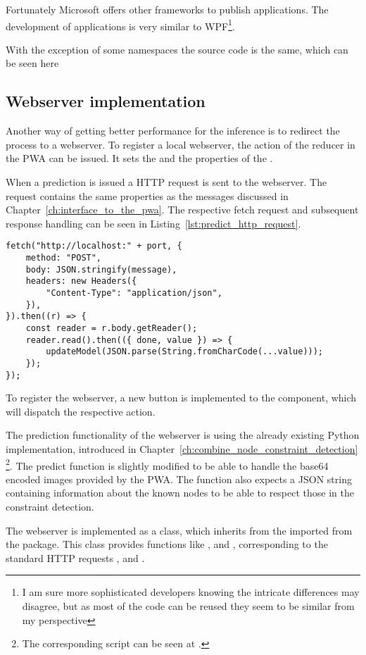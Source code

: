 Fortunately Microsoft offers other frameworks to publish applications.
The development of  applications is very similar to WPF\footnote{I am sure more sophisticated developers knowing the intricate differences may disagree, but as most of the code can be reused they seem to be similar from my perspective}.

With the exception of some namespaces the source code is the same, which can be seen here 

\subsection{Webserver implementation}

Another way of getting better performance for the inference is to redirect the process to a webserver.
To register a local webserver, the  action of the  reducer in the PWA can be issued.
It sets the  and the  properties of the .

When a prediction is issued a HTTP request is sent to the webserver.
The request  contains the same properties as the messages discussed in Chapter~\ref{ch:interface_to_the_pwa}.
The respective fetch request and subsequent response handling can be seen in Listing~\ref{lst:predict_http_request}.

\begin{lstlisting}[label={lst:predict_http_request}, caption={Communication of PWA via HTTP.}]
fetch("http://localhost:" + port, {
    method: "POST",
    body: JSON.stringify(message),
    headers: new Headers({
        "Content-Type": "application/json",
    }),
}).then((r) => {
    const reader = r.body.getReader();
    reader.read().then(({ done, value }) => {
        updateModel(JSON.parse(String.fromCharCode(...value)));
    });
});
\end{lstlisting}

To register the webserver, a new button is implemented to the  component, which will dispatch the respective  action. 

The prediction functionality of the webserver is using the already existing Python implementation, introduced in Chapter~\ref{ch:combine_node_constraint_detection}
\footnote{The corresponding script can be seen at .}.
The predict function is slightly modified to be able to handle the base64 encoded images provided by the PWA.
The function also expects a JSON string containing information about the known nodes to be able to respect those in the constraint detection.

The webserver is implemented as a  class, which inherits from the  imported from the  package.
This class provides functions like ,  and , corresponding to the standard HTTP requests ,  and .


